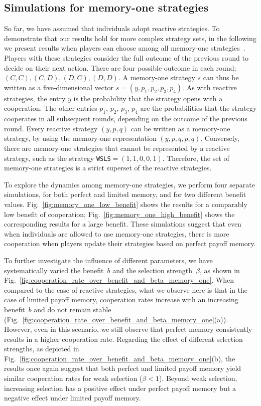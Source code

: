 \documentclass[11pt]{article}
\def\strategy{s}
\theoremstyle{plainCl1}
\theoremstyle{plainCl2}
\begin{document}
\subsection{Simulations for memory-one strategies}\label{section:memory_one}

So far, we have assumed that individuals adopt reactive strategies.
To demonstrate that our results hold for more complex strategy sets, 
in the following we present results when players can choose among all memory-one strategies~\citep{sigmund2010calculus}. 
Players with these strategies consider the full outcome of the
previous round to decide on their next action. 
There are four possible outcome in each
round; \((C, C), (C, D), (D, C), (D, D)\). 
A memory-one strategy \(\strategy\) can thus be
written as a five-dimensional vector \(\strategy=(y, p_1, p_2, p_3, p_4)\). 
As with reactive strategies, the entry \(y\) is the probability that the strategy opens with a cooperation.
The other entries \(p_1\), \(p_2\), \(p_3\), \(p_4\) are the probabilities that the strategy
cooperates in all subsequent rounds, depending on the outcome of the previous round.
Every reactive strategy $(y,p,q)$ can be written as a memory-one strategy, by using the memory-one representation $(y,p,q,p,q)$.
Conversely, there are memory-one strategies that cannot be represented by a reactive strategy, such as the strategy \texttt{WSLS}$=(1,1,0,0,1)$. 
Therefore, the set of memory-one strategies is a strict superset of the reactive strategies. 

To explore the dynamics among memory-one strategies, we perform four separate simulations, for both perfect and limited memory, and for two different benefit values. 
Fig.~\ref{fig:memory_one_low_benefit} shows the results for a comparably low benefit of cooperation; 
Fig.~\ref{fig:memory_one_high_benefit} shows the corresponding results for a large benefit. 
These simulations suggest that even when individuals
are allowed to use memory-one strategies, there is more cooperation when players update their strategies based on perfect payoff memory. 

To further investigate the influence of different parameters, we have
systematically varied the benefit~$b$ and the selection strength~$\beta$, as
shown in Fig.~\ref{fig:cooperation_rate_over_benefit_and_beta_memory_one}.
When compared to the case of reactive strategies, what we observe
here is that in the case of limited payoff memory, cooperation rates increase
with an increasing benefit~$b$ and do not remain stable
(Fig.~\ref{fig:cooperation_rate_over_benefit_and_beta_memory_one}(a)). However,
even in this scenario, we still observe that perfect memory consistently results
in a higher cooperation rate.
Regarding the effect of different selection strengths, as depicted in
Fig.~\ref{fig:cooperation_rate_over_benefit_and_beta_memory_one}(b), the results
once again suggest that both perfect and limited payoff memory yield similar
cooperation rates for weak selection (\(\beta \!<\! 1\)). Beyond weak selection, increasing
selection has a positive effect under perfect payoff memory but a negative
effect under limited payoff memory.
\end{document}
